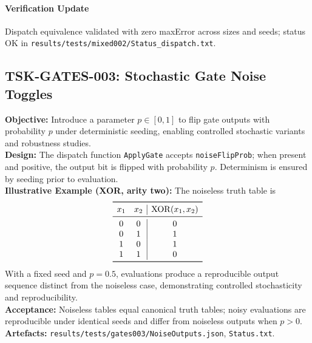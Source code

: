 \documentclass{article}
\begin{document}
\paragraph{Verification Update} Dispatch equivalence validated with zero maxError across sizes and seeds; status OK in \texttt{results/tests/mixed002/Status\_dispatch.txt}.

\subsection{TSK-GATES-003: Stochastic Gate Noise Toggles}
\textbf{Objective:} Introduce a parameter \(p\in[0,1]\) to flip gate outputs with probability \(p\) under deterministic seeding, enabling controlled stochastic variants and robustness studies.\\
\textbf{Design:} The dispatch function \texttt{ApplyGate} accepts \texttt{noiseFlipProb}; when present and positive, the output bit is flipped with probability \(p\). Determinism is ensured by seeding prior to evaluation.\\
\textbf{Illustrative Example (XOR, arity two):} The noiseless truth table is
\[
\begin{array}{cc|c}
\toprule
 x_1 & x_2 & \mathrm{XOR}(x_1,x_2) \\
\midrule
 0 & 0 & 0 \\
 0 & 1 & 1 \\
 1 & 0 & 1 \\
 1 & 1 & 0 \\
\bottomrule
\end{array}
\]
With a fixed seed and \(p=0.5\), evaluations produce a reproducible output sequence distinct from the noiseless case, demonstrating controlled stochasticity and reproducibility.\\
\textbf{Acceptance:} Noiseless tables equal canonical truth tables; noisy evaluations are reproducible under identical seeds and differ from noiseless outputs when \(p>0\).\\
\textbf{Artefacts:} \texttt{results/tests/gates003/NoiseOutputs.json}, \texttt{Status.txt}.
\end{document}
